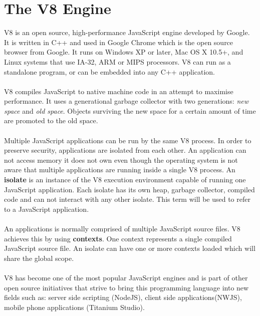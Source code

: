 \documentclass{l4proj}
\begin{document}
\section{The V8 Engine}
\hspace*{3em} V8 is an open source, high-performance JavaScript engine developed by Google. It is written in C++ and used in Google Chrome which is the open source browser from Google. It runs on Windows XP or later, Mac OS X 10.5+, and Linux systems that use IA-32, ARM or MIPS processors. V8 can run as a standalone program, or can be embedded into any C++ application.\cite{v8}
\\\\
\hspace*{3em} V8 compiles JavaScript to native machine code in an attempt to maximise performance. It uses a generational garbage collector with two generations: \textit{new space} and \textit{old space}. Objects surviving the new space for a certain amount of time are promoted to the old space.
\\\\
\hspace*{3em} Multiple JavaScript applications can be run by the same V8 process. In order to preserve security, applications are isolated from each other. An application can not access memory it does not own even though the operating system is not aware that multiple applications are running inside a single V8 process. An \textbf{isolate} is an instance of the V8 execution environment capable of running one JavaScript application. Each isolate has its own heap, garbage collector, compiled code and can not interact with any other isolate. This term will be used to refer to a JavaScript application.
\\\\
\hspace*{3em} An applications is normally comprised of multiple JavaScript source files. V8 achieves this by using \textbf{contexts}. One context represents a single compiled JavaScript source file. An isolate can have one or more contexts loaded which will share the global scope. 
\\\\
\hspace*{3em} V8 has become one of the most popular JavaScript engines and is part of other open source initiatives that strive to bring this programming language into new fields such as: server side scripting (NodeJS), client side applications(NWJS), mobile phone applications (Titanium Studio).
\end{document}
